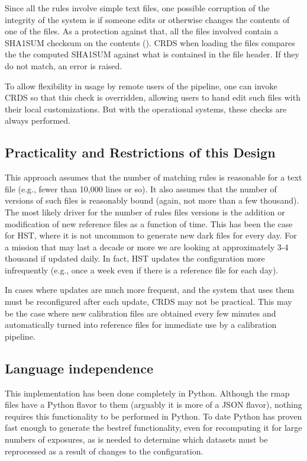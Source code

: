\documentclass[final,authoryear,5p,times,twocolumn]{elsarticle}
\begin{document}
Since all the rules involve simple text files, one possible corruption of the
integrity of the system is if someone edits or otherwise changes the
contents of one of the files. As a protection against that, all the files
involved contain a SHA1SUM checksum on the contents 
(\citealt{sha1ref}).
CRDS when loading the
files compares the the computed SHA1SUM against what is contained in the 
file header. If they do not match, an error is raised.

To allow flexibility in usage by remote users of the pipeline, one can
invoke CRDS so that this check is overridden, allowing users to hand edit 
such files with their local customizations. But with the operational systems,
these checks are always performed.

\subsection{Practicality and Restrictions of this Design}

This approach assumes that the number of matching rules is reasonable for a
text file (e.g., fewer than 10,000 lines or so). It also assumes that the
number of versions of such files is reasonably bound (again, not more than a
few thousand). The most likely driver for the number of rules files versions is
the addition or modification of new reference files as a function of time. This has
been the case for HST, where it is not uncommon to generate new dark files for
every day. For a mission that may last a decade or more we are looking at
approximately 3-4 thousand if updated daily. In fact, HST updates the
configuration more infrequently (e.g., once a week even if there is a reference
file for each day).

In cases where updates are much more frequent, and the system that uses
them must be reconfigured after each update, CRDS may not be practical. This
may be the case where new calibration files are obtained every few minutes and
automatically turned into reference files for immediate use by a calibration
pipeline.

\subsection{Language independence}

This implementation has been done completely in Python. Although the rmap files
have a Python flavor to them (arguably it is more of a JSON flavor), nothing
requires this functionality to be performed in Python. To date Python has
proven fast enough to generate the bestref functionality, even for recomputing it
for large numbers of exposures, as is needed to determine which datasets must
be reprocessed as a result of changes to the configuration.
\end{document}
